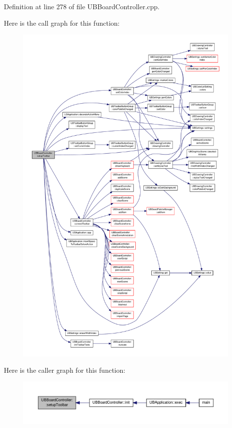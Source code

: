 Definition at line 278 of file U\-B\-Board\-Controller.\-cpp.



Here is the call graph for this function\-:
\nopagebreak
\begin{figure}[H]
\begin{center}
\leavevmode
\includegraphics[width=350pt]{d7/d62/class_u_b_board_controller_a6761e02604fb3aa8ecbfc5fd4a5d87f3_cgraph}
\end{center}
\end{figure}




Here is the caller graph for this function\-:
\nopagebreak
\begin{figure}[H]
\begin{center}
\leavevmode
\includegraphics[width=350pt]{d7/d62/class_u_b_board_controller_a6761e02604fb3aa8ecbfc5fd4a5d87f3_icgraph}
\end{center}
\end{figure}


